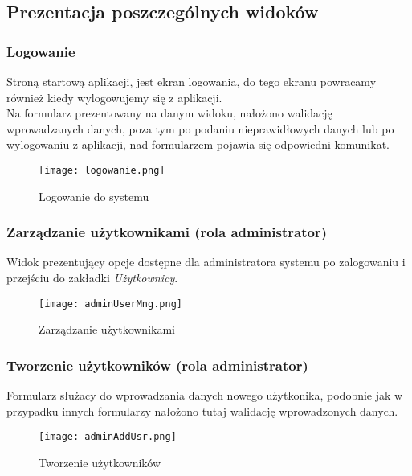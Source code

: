 \documentclass[a4paper, titlepage]{article}
\begin{document}
\subsection{Prezentacja poszczególnych widoków}

\subsubsection{Logowanie}

Stroną startową aplikacji, jest ekran logowania, do tego ekranu powracamy również kiedy wylogowujemy się z aplikacji.
\\Na formularz prezentowany na danym widoku, nałożono walidację wprowadzanych danych, poza tym po podaniu nieprawidłowych danych lub po wylogowaniu z aplikacji, nad formularzem pojawia się odpowiedni komunikat.

      \begin{figure}[H]
      	\centering
      	\texttt{[image: logowanie.png]}
      	\caption{Logowanie do systemu}
	   \end{figure}

\subsubsection{Zarządzanie użytkownikami (rola \textbf{administrator})}

Widok prezentujący opcje dostępne dla administratora systemu po zalogowaniu i przejściu do zakładki \textit{Użytkownicy}.

      \begin{figure}[H]
      	\centering
      	\texttt{[image: adminUserMng.png]}
      	\caption{Zarządzanie użytkownikami}
	   \end{figure}

\subsubsection{Tworzenie użytkowników (rola \textbf{administrator})}

Formularz służacy do wprowadzania danych nowego użytkonika, podobnie jak w przypadku innych formularzy nałożono tutaj walidację wprowadzonych danych.

	   \begin{figure}[H]
      	\centering
      	\texttt{[image: adminAddUsr.png]}
      	\caption{Tworzenie użytkowników}
	   \end{figure}
\end{document}
